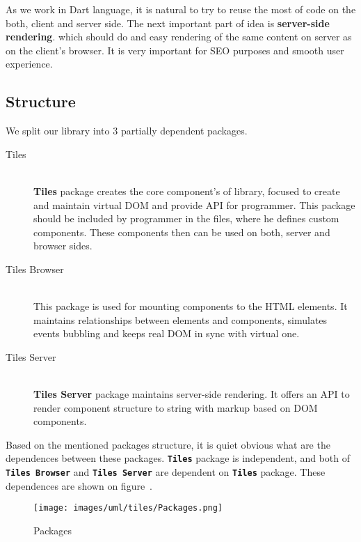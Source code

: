 \documentclass[oneside, 12pt]{book}
\begin{document}
    As we work in Dart language, it is natural to try to reuse the most of code on the both, client and server side.
    The next important part of idea is \textbf{server-side rendering}.
    which should do and easy rendering of the same content on server as on the client's browser.
    It is very important for SEO purposes and smooth user experience. 

  \subsection{Structure}\label{subsec:our-architecture-structure}

    We split our library into 3 partially dependent packages. 
    \begin{description}
      \item[Tiles] \hfill \\
        \textbf{Tiles} package creates the core component's of library, focused to create and maintain virtual DOM and provide API for programmer.
        This package should be included by programmer in the files, where he defines custom components. 
        These components then can be used on both, server and browser sides.
      \item[Tiles Browser] \hfill \\
        This package is used for mounting components to the HTML elements. 
        It maintains relationships between elements and components, 
        simulates events bubbling and keeps real DOM in sync with virtual one.
      \item[Tiles Server] \hfill \\
        \textbf{Tiles Server} package maintains server-side rendering. It offers an API to render component structure to string with markup based on DOM components.
    \end{description}

    Based on the mentioned packages structure, it is quiet obvious what are the dependences between these packages.
    \texttt{\textbf{Tiles}} package is independent, 
		and both of \texttt{\textbf{Tiles Browser}} and \texttt{\textbf{Tiles Server}} are dependent on \texttt{\textbf{Tiles}} package.
    These dependences are shown on figure~.

    \begin{figure}[h]
    \centering  
      \texttt{[image: images/uml/tiles/Packages.png]}
      \caption{Packages}
      \label{img:library-packages}
    \end{figure}
\end{document}
